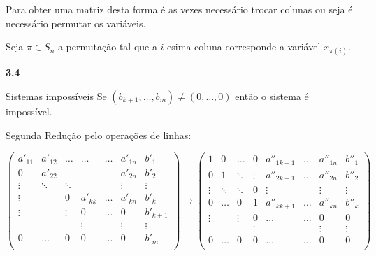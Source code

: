 \documentclass{beamer}
\begin{document}
\begin{frame}
Para obter uma matriz desta forma é as vezes necessário trocar colunas ou seja é necessário permutar os variáveis.

\medskip
\pause
Seja $\pi \in S_n$ a permutação tal que a $i$-esima coluna corresponde a variável $x_{\pi(i)}$.
\end{frame}


\begin{frame}{\bf 3.4}{}
\begin{block}{Sistemas impossíveis}
Se $(b_{k+1}, \ldots, b_m) \neq (0,\ldots, 0)$ então o sistema é impossível.
\end{block}
\pause

Segunda Redução pelo operações de linhas:

{\tiny 
$$
\left( \begin{array}{cccccc|l}
a'_{11}   & a'_{12} & \ldots  & \ldots  & \ldots  & a'_{1n}  & b'_1 \\
0         & a'_{22} &  &   &   & a'_{2n}  & b'_2 \\
   \vdots & \ddots  & \ddots  &   &   &  \vdots        & \vdots \\
 \vdots       &  &  0      & a'_{kk} & \ldots  & a'_{kn}  & b'_k \\
\vdots   &         & \vdots  & 0       & \ldots  & 0        & b'_{k+1} \\
         &         &         &  \vdots       &   &   \vdots & \vdots \\
0         & \ldots  & 0      &  0       &  \ldots       & 0         & b'_m \\
\end{array}\right)
\rightarrow
\left( \begin{array}{ccccccc|l}
1   & 0       & \ldots  & 0       & a''_{1 {k+1}}& \ldots  & a''_{1n}  & b''_1 \\
0         & 1 &      \ddots  & \vdots       & a''_{2 {k+1}}& \ldots  & a''_{2n}  & b''_2 \\
   \vdots & \ddots  & \ddots  &  0           & \vdots        &         &  \vdots   & \vdots \\
 0        & \ldots  &  0      & 1      & a''_{k {k+1}}   & \ldots  & a''_{kn}  & b''_k \\
\vdots   &         & \vdots   & 0            & \ldots            &\ldots   & 0        & 0 \\
         &         &         &  \vdots       &               &         & \vdots & \vdots \\
0         & \ldots  & 0      &  0            & \ldots             &  \ldots  & 0         & 0 \\
\end{array}\right)
$$}


\end{frame}
\end{document}
